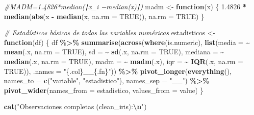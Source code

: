 \documentclass[
]{article}
\newenvironment{Shaded}{\begin{snugshade}}{\end{snugshade}}
\newcommand{\AttributeTok}[1]{\textcolor[rgb]{0.13,0.29,0.53}{#1}}
\newcommand{\CommentTok}[1]{\textcolor[rgb]{0.56,0.35,0.01}{\textit{#1}}}
\newcommand{\ConstantTok}[1]{\textcolor[rgb]{0.56,0.35,0.01}{#1}}
\newcommand{\ControlFlowTok}[1]{\textcolor[rgb]{0.13,0.29,0.53}{\textbf{#1}}}
\newcommand{\FloatTok}[1]{\textcolor[rgb]{0.00,0.00,0.81}{#1}}
\newcommand{\FunctionTok}[1]{\textcolor[rgb]{0.13,0.29,0.53}{\textbf{#1}}}
\newcommand{\NormalTok}[1]{#1}
\newcommand{\OtherTok}[1]{\textcolor[rgb]{0.56,0.35,0.01}{#1}}
\newcommand{\SpecialCharTok}[1]{\textcolor[rgb]{0.81,0.36,0.00}{\textbf{#1}}}
\newcommand{\StringTok}[1]{\textcolor[rgb]{0.31,0.60,0.02}{#1}}
\begin{document}
\begin{Shaded}
\begin{Highlighting}[]
\CommentTok{\#MADM=1.4826*median(∣x\_i −median(x)∣)}
\NormalTok{madm }\OtherTok{\textless{}{-}} \ControlFlowTok{function}\NormalTok{(x) \{}
  \FloatTok{1.4826} \SpecialCharTok{*} \FunctionTok{median}\NormalTok{(}\FunctionTok{abs}\NormalTok{(x }\SpecialCharTok{{-}} \FunctionTok{median}\NormalTok{(x, }\AttributeTok{na.rm =} \ConstantTok{TRUE}\NormalTok{)), }\AttributeTok{na.rm =} \ConstantTok{TRUE}\NormalTok{)}
\NormalTok{\}}

\CommentTok{\# Estadísticos básicos de todas las variables numéricas}
\NormalTok{estadisticos }\OtherTok{\textless{}{-}} \ControlFlowTok{function}\NormalTok{(df) \{}
\NormalTok{  df }\SpecialCharTok{\%\textgreater{}\%}
    \FunctionTok{summarise}\NormalTok{(}\FunctionTok{across}\NormalTok{(}\FunctionTok{where}\NormalTok{(is.numeric),}
                     \FunctionTok{list}\NormalTok{(}\AttributeTok{media   =} \SpecialCharTok{\textasciitilde{}} \FunctionTok{mean}\NormalTok{(.x, }\AttributeTok{na.rm =} \ConstantTok{TRUE}\NormalTok{),}
                          \AttributeTok{sd      =} \SpecialCharTok{\textasciitilde{}} \FunctionTok{sd}\NormalTok{(.x, }\AttributeTok{na.rm =} \ConstantTok{TRUE}\NormalTok{),}
                          \AttributeTok{mediana =} \SpecialCharTok{\textasciitilde{}} \FunctionTok{median}\NormalTok{(.x, }\AttributeTok{na.rm =} \ConstantTok{TRUE}\NormalTok{),}
                          \AttributeTok{madm    =} \SpecialCharTok{\textasciitilde{}} \FunctionTok{madm}\NormalTok{(.x),}
                          \AttributeTok{iqr     =} \SpecialCharTok{\textasciitilde{}} \FunctionTok{IQR}\NormalTok{(.x, }\AttributeTok{na.rm =} \ConstantTok{TRUE}\NormalTok{)),}
                     \AttributeTok{.names =} \StringTok{"\{.col\}\_\_\{.fn\}"}\NormalTok{)) }\SpecialCharTok{\%\textgreater{}\%}
    \FunctionTok{pivot\_longer}\NormalTok{(}\FunctionTok{everything}\NormalTok{(), }\AttributeTok{names\_to =} \FunctionTok{c}\NormalTok{(}\StringTok{"variable"}\NormalTok{, }\StringTok{"estadistico"}\NormalTok{),}
                 \AttributeTok{names\_sep =} \StringTok{"\_\_"}\NormalTok{) }\SpecialCharTok{\%\textgreater{}\%}
    \FunctionTok{pivot\_wider}\NormalTok{(}\AttributeTok{names\_from =}\NormalTok{ estadistico, }\AttributeTok{values\_from =}\NormalTok{ value)}
\NormalTok{\}}

\FunctionTok{cat}\NormalTok{(}\StringTok{"Observaciones completas (clean\_iris):}\SpecialCharTok{\textbackslash{}n}\StringTok{"}\NormalTok{)}
\end{Highlighting}
\end{Shaded}
\end{document}
